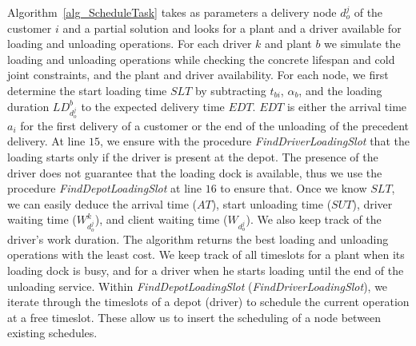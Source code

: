 \documentclass{article}
\begin{document}
 Algorithm~\ref{alg_ScheduleTask} takes as parameters a delivery node $d^j_{o}$ of the customer $i$ and a partial solution and looks for a plant and a driver available for loading and unloading operations. For each driver $k$ and plant $b$ we simulate the loading and unloading operations while checking the concrete lifespan and cold joint constraints, and the plant and driver availability. For each node, we first determine the start loading time $SLT$ by subtracting $t_{bi}$, $\alpha_b$, and the loading duration $LD^b_{d^j_{o}}$ to the expected delivery time $EDT$. $EDT$ is either the arrival time $a_i$ for the first delivery of a customer or the end of the unloading of the precedent delivery. At line $15$, we ensure with the procedure \textit{ FindDriverLoadingSlot} that the loading starts only if the driver is present at the depot. The presence of the driver does not guarantee that the loading dock is available, thus we use the procedure \textit{FindDepotLoadingSlot} at line $16$ to ensure that. Once we know $SLT$, we can easily deduce the arrival time ($AT$), start unloading time ($SUT$), driver waiting time ($W^k_{d^j_o}$), and client waiting time ($W_{d^j_o}$). We also keep track of the driver's work duration. The algorithm returns the best loading and unloading operations with the least cost.  
 We keep track of all timeslots for a plant when its loading dock is busy, and for a driver when he starts loading until the end of the unloading service. Within \textit{FindDepotLoadingSlot} (\textit{FindDriverLoadingSlot}), we iterate through the timeslots of a depot (driver) to schedule the current operation at a free timeslot. These allow us to insert the scheduling of a node between existing schedules.
 
\end{document}
